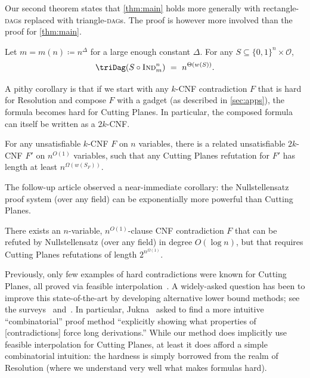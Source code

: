 \documentclass{toc}
\newcommand{\Ind}{\textsc{Ind}}
\newcommand{\DAGs}{\textsc{dag}s\xspace}
\newcommand{\calO}{\mathcal{O}}
\begin{document}
\bigskip\noindent
Our second theorem states that \autoref{thm:main} holds more generally with rectangle-\DAGs replaced with triangle-\DAGs. The proof is however more involved than the proof for \autoref{thm:main}.
\begin{theorem} \label{thm:triangle}
Let $m=m(n)\coloneqq n^\Delta$ for a large enough constant $\Delta$. For any $S\subseteq\{0,1\}^n\times \calO$,
\[
\triDag(S\circ \Ind_m^n)~=~
n^{\Theta(w(S))}.
\]
\end{theorem}

A pithy corollary is that if we start with any $k$-CNF contradiction $F$ that is hard for Resolution and compose $F$ with a gadget (as described in \autoref{sec:apps}), the formula becomes hard for Cutting Planes. In particular, the composed formula can itself be written as a $2k$-CNF.

\begin{corollary}\label{cor:cutting-lb}
For any unsatisfiable $k$-CNF $F$ on $n$ variables, there is a related unsatisfiable $2k$-CNF $F'$ on $n^{O(1)}$ variables, such that any Cutting Planes refutation for $F'$ has length at least $n^{\Omega(w(S_F))}$.
\end{corollary}

The follow-up %
article \cite{goos19monotone} %
observed a near-immediate corollary: the Nullstellensatz proof system (over any field) can be exponentially more powerful than Cutting Planes.

\begin{corollary}\label{cor:cp-vs-ns}
There exists an $n$-variable, $n^{O(1)}$-clause CNF contradiction $F$ that can be refuted by Nullstellensatz (over any field) in degree $O(\log n)$, but that requires Cutting Planes refutations of length $2^{n^{\Omega(1)}}$.
\end{corollary}

Previously, only few examples of hard contradictions were known for Cutting Planes, all proved via feasible interpolation~\cite{pudlak97lower,haken99exponential,hrubes17randomformulas,fleming17randomcnf}. A widely-asked question has been to improve this state-of-the-art by developing alternative lower bound methods; see the surveys~\cite[\S4]{beame01propositional} and~\cite[\S5]{razborov16proof}. In particular, Jukna~\cite[Research Problem 19.17]{jukna12boolean} asked to find a more intuitive ``combinatorial'' proof method ``explicitly showing what properties of [contradictions] force long derivations.'' While our method does implicitly use feasible interpolation for Cutting Planes, at least it does afford a simple combinatorial intuition: the hardness is simply borrowed from the realm of Resolution (where we understand very well what makes formulas hard).
\end{document}
